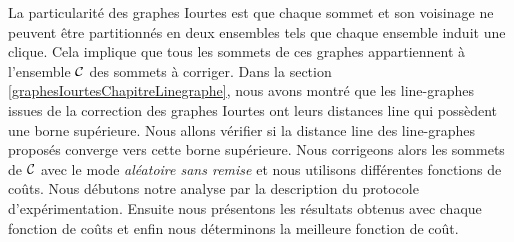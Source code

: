 La particularit\'e des graphes Iourtes est que chaque sommet et son voisinage ne peuvent \^etre partitionn\'es en deux ensembles tels que chaque ensemble induit une clique.
Cela implique que tous les sommets de ces graphes appartiennent \`a l'ensemble $\cal C$ des sommets \`a corriger.
\newline
Dans la section \ref{graphesIourtesChapitreLinegraphe}, nous avons montr\'e que les line-graphes issues de la correction des graphes Iourtes ont leurs distances line qui poss\`edent une borne sup\'erieure.
Nous allons v\'erifier si la distance line des line-graphes propos\'es converge vers cette borne sup\'erieure. Nous corrigeons alors les sommets de $\cal C$ avec le mode {\em al\'eatoire sans remise}  et nous utilisons diff\'erentes fonctions de co\^uts.
\newline
Nous d\'ebutons notre analyse par la description du protocole d'exp\'erimentation. Ensuite nous pr\'esentons les r\'esultats obtenus avec chaque fonction de co\^uts et enfin nous d\'eterminons la meilleure fonction de co\^ut. 